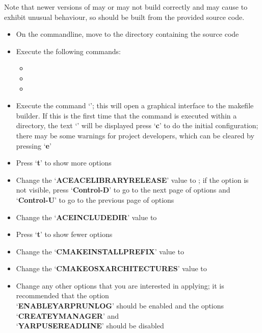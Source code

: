 Note that newer versions of \yarp{} may or may not build correctly and may cause
\mplusm{} to exhibit unusual behaviour, so \yarp{} should be built from the provided
source code.
\begin{itemize}
\item On the command\longDash{}line, move to the directory containing the \yarp{} source
code \longDash{} 
\item\exSp{}Execute the following commands:
\begin{itemize}
\item {}
\item\exSp{}
\item\exSp{}
\end{itemize}
\item\exSp{}Execute the command `'; this will open a graphical
interface to the makefile builder. If this is the first time that the command is executed
within a directory, the text `' will be displayed \longDash{} press
`\textbf{c}' to do the initial configuration; there may be some warnings for project
developers, which can be cleared by pressing `\textbf{e}'
\item\exSp{}Press `\textbf{t}' to show more options
\item\exSp{}Change the `\textbf{ACE\fUS{}ACE\fUS{}LIBRARY\fUS{}RELEASE}' value to
; if the option is not visible, press
`\textbf{Control-D}' to go to the next page of options and `\textbf{Control-U}' to go to
the previous page of options
\item\exSp{}Change the `\textbf{ACE\fUS{}INCLUDE\fUS{}DIR}' value to
\item\exSp{}Press `\textbf{t}' to show fewer options
\item\exSp{}Change the `\textbf{CMAKE\fUS{}INSTALL\fUS{}PREFIX}' value to
\item\exSp{}Change the `\textbf{CMAKE\fUS{}OSX\fUS{}ARCHITECTURES}' value to
\item\exSp{}Change any other options that you are interested in applying; it is
recommended that the option\\
`\textbf{ENABLE\fUS{}YARPRUN\fUS{}LOG}' should be enabled and the options
`\textbf{CREATE\fUS{}YMANAGER}' and\\
`\textbf{YARP\fUS{}USE\fUS{}READLINE}' should be disabled

\end{itemize}
